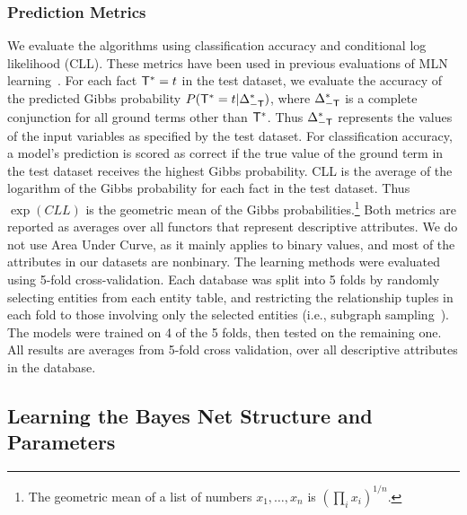 \documentclass[runningheads,a4paper]{llncs}
\begin{document}
\subsubsection{Prediction Metrics}
We evaluate the algorithms using classification
accuracy and conditional log likelihood (CLL). These metrics have been used in previous evaluations of MLN learning~\cite{Domingos2007,Schulte2012}.  For each fact $\mathsf{T}^{*}\hspace{0.0ex} = t$ in the test dataset, we evaluate the accuracy of the predicted Gibbs probability $P(\mathsf{T}^{*}\hspace{0.0ex} = t | \Delta_{-\mathsf{T}}^{*}\hspace{0.0ex})$, where $\Delta_{-\mathsf{T}}^{*}\hspace{0.0ex}$ is a complete conjunction for all ground terms other than $\mathsf{T}^{*}\hspace{0.0ex}$. Thus $\Delta_{-\mathsf{T}}^{*}\hspace{0.0ex}$ represents the values of the input variables as specified by the test dataset.
For classification accuracy, a model's prediction is scored as correct if the true value of the ground term in the test dataset receives the highest Gibbs probability. 
CLL is the average of the logarithm of the Gibbs probability for each fact in the test dataset. Thus $\exp(CLL)$ is the geometric mean of the Gibbs probabilities.\footnote{The geometric mean of a list of numbers $x_{1},\ldots,x_{n}$ is $(\prod_{i} x_{i})^{1/n}$.}
Both metrics are reported as averages over all functors that represent descriptive attributes. We do not use Area Under Curve, as it mainly applies to binary values, and most of the attributes in our datasets are nonbinary.
The learning methods were evaluated using 5-fold cross-validation. Each database was split into 5 folds by randomly selecting entities from each entity table, and restricting the relationship tuples in each fold to those involving only the selected entities  (i.e., subgraph sampling~\cite{Frank1977,Schulte2012}). The models were trained on 4 of the 5 folds, then tested on the remaining one. All results are averages from 5-fold cross validation, over all descriptive attributes in the database. 


\subsection{Learning the Bayes Net Structure and Parameters}
\end{document}
